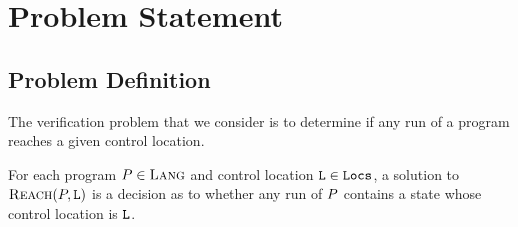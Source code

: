 \section{Problem Statement}
\label{sec:problem-stmt}

\subsection{Problem Definition}
\label{sec:problem-defn}
%
The verification problem that we consider is to determine if any run
of a program reaches a given control location.
\begin{defn}
  \label{defn:problem-defn}
  For each \lang program $P \in \textsc{Lang}$ and control location
  $\mathtt{L} \in \mathtt{Locs}$, a solution to $\textsc{Reach}(P, \mathtt{L})$ is a
  decision as to whether any run of $P$ contains a state whose
  control location is $\mathtt{L}$.
\end{defn}

